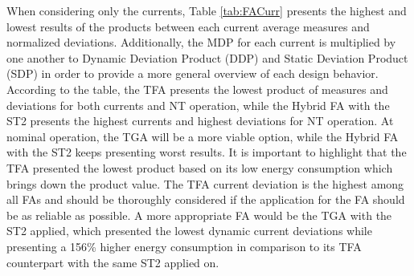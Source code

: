 \documentclass[diss,pgmicro,english]{iiufrgs}
\begin{document}
\begin{table}[]
\centering
\caption{Overall results considering the EDP and DPP for each metric and the product between those.}
\label{tab:edpddp}
\end{table}

When considering only the currents, Table \ref{tab:FACurr} presents the highest and lowest results of the products between each current average measures and normalized deviations. Additionally, the MDP for each current is multiplied by one another to Dynamic Deviation Product (DDP) and Static Deviation Product (SDP) in order to provide a more general overview of each design behavior. According to the table, the TFA presents the lowest product of measures and deviations for both currents and NT operation, while the Hybrid FA with the ST2 presents the highest currents and highest deviations for NT operation. At nominal operation, the TGA will be a more viable option, while the Hybrid FA with the ST2 keeps presenting worst results. It is important to highlight that the TFA presented the lowest product based on its low energy consumption which brings down the product value. The TFA current deviation is the highest among all FAs and should be thoroughly considered if the application for the FA should be as reliable as possible. A more appropriate FA would be the TGA with the ST2 applied, which presented the lowest dynamic current deviations while presenting a 156\% higher energy consumption in comparison to its TFA counterpart with the same ST2 applied on.
\end{document}
